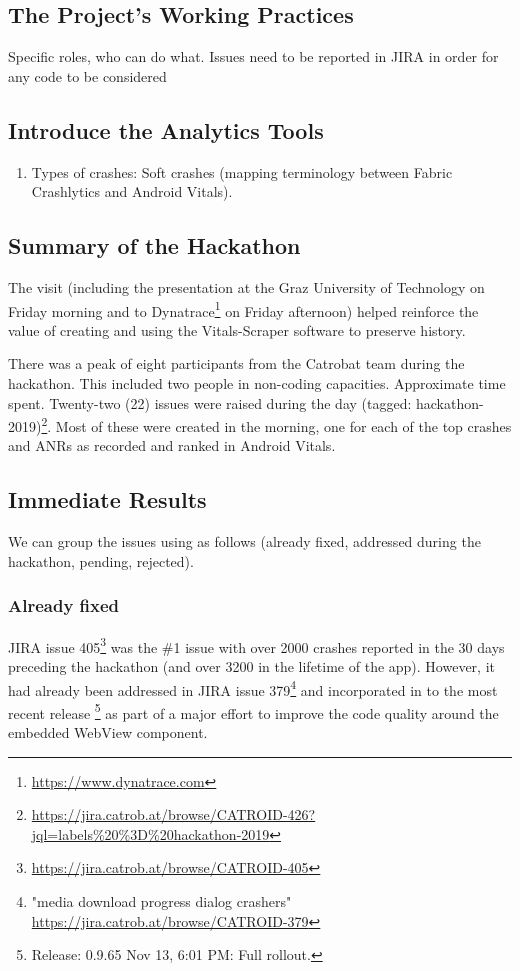 \subsection{The Project's Working Practices}
Specific roles, who can do what.
Issues need to be reported in JIRA in order for any code to be considered

\subsection{Introduce the Analytics Tools}
\begin{enumerate}
    \item Types of crashes: Soft crashes (mapping terminology between Fabric Crashlytics and Android Vitals).
\end{enumerate}

\subsection{Summary of the Hackathon}
The visit (including the presentation at the Graz University of Technology on Friday morning and to Dynatrace\footnote{\url{https://www.dynatrace.com}} on Friday afternoon) helped reinforce the value of creating and using the Vitals-Scraper software to preserve history. 

There was a peak of eight participants from the Catrobat team during the hackathon. This included two people %
in non-coding capacities. Approximate time spent. Twenty-two (22) issues were raised during the day (tagged: hackathon-2019)\footnote{\url{https://jira.catrob.at/browse/CATROID-426?jql=labels\%20\%3D\%20hackathon-2019}}. Most of these were created in the morning, one for each of the top crashes and ANRs as recorded and ranked in Android Vitals. 

\subsection{Immediate Results}
We can group the issues using as follows (already fixed, addressed during the hackathon, pending, rejected).

\subsubsection{Already fixed} JIRA issue 405\footnote{\url{https://jira.catrob.at/browse/CATROID-405}} was the \#1 issue with over 2000 crashes reported in the 30 days preceding the hackathon (and over 3200 in the lifetime of the app). However, it had already been addressed in JIRA issue 379\footnote{"media download progress dialog crashers" \url{https://jira.catrob.at/browse/CATROID-379}} and incorporated in to the most recent release \footnote{Release:
0.9.65 Nov 13, 6:01 PM: Full rollout.} as part of a major effort to improve the code quality around the embedded WebView component.

